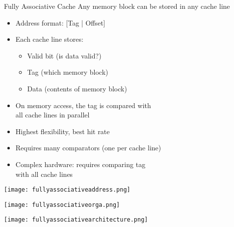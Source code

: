 \begin{concept}{Fully Associative Cache}
    Any memory block can be stored in any cache line

    \begin{minipage}{0.5\linewidth}
\begin{itemize}
    \item Address format: [Tag | Offset]
    \item Each cache line stores:
    \begin{itemize}
        \item Valid bit (is data valid?)
        \item Tag (which memory block)
        \item Data (contents of memory block)
    \end{itemize}
    \item On memory access, the tag is compared with \\all cache lines in parallel
    \item Highest flexibility, best hit rate
    \item Requires many comparators (one per cache line)
    \item Complex hardware: requires comparing tag \\with all cache lines
\end{itemize}
    \end{minipage}
    \begin{minipage}{0.5\linewidth}
\texttt{[image: fullyassociativeaddress.png]}
\end{minipage}

\begin{center}
\texttt{[image: fullyassociativeorga.png]}
\end{center}


\begin{center}
\texttt{[image: fullyassociativearchitecture.png]}
\end{center}

\end{concept}


